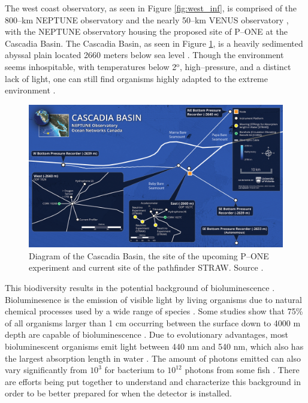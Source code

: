 The west coast observatory, as seen in Figure \ref{fig:west_inf}, is comprised of the 800--km NEPTUNE observatory and the nearly 50--km VENUS observatory \cite{onc}, with the NEPTUNE observatory housing the proposed site of P--ONE at the Cascadia Basin. The Cascadia Basin, as seen in Figure \ref{fig:casc}, is a heavily sedimented abyssal plain located 2660 meters below sea level \cite{onc}. Though the environment seems inhospitable, with temperatures below 2$^{\text{o}}$, high--pressure, and a distinct lack of light, one can still find organisms highly adapted to the extreme environment \cite{onc}. 

\begin{figure}
  \centering
  \includegraphics[width=.9\textwidth]{./Figures/cascadia_basin.png}
  \caption{Diagram of the Cascadia Basin, the site of the upcoming P--ONE experiment and current site of the pathfinder STRAW. Source \cite{onc}.}
  \label{fig:casc}
\end{figure}

This biodiversity results in the potential background of bioluminescence \cite{pone,onc,biolum,biolum_rec}. Bioluminesence is the emission of visible light by living organisms due to natural chemical processes used by a wide range of species \cite{biolum}. Some studies show that 75\% of all organisms larger than 1 cm occurring between the surface down to 4000 m depth are capable of bioluminescence \cite{biolum_rec}. Due to evolutionary advantages, most bioluminescent organisms emit light between 440 nm and 540 nm, which also has the largest absorption length in water \cite{biolum}. The amount of photons emitted can also vary significantly from $10^{3}$ for bacterium to $10^{12}$ photons from some fish \cite{biolum}. There are efforts being put together to understand and characterize this background in order to be better prepared for when the detector is installed.



